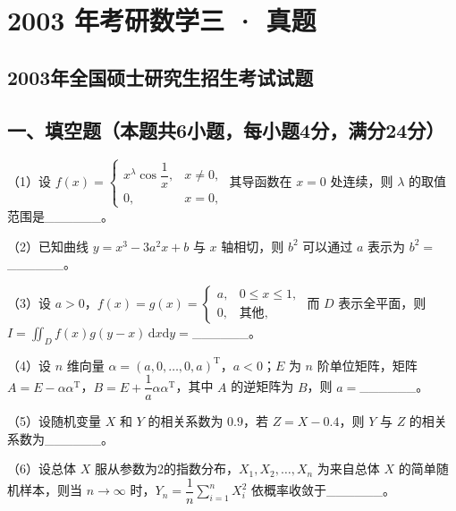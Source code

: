 \documentclass[UTF8,12pt]{ctexart}
\begin{document}
\section*{2003 年考研数学三 · 真题}
\subsection*{2003年全国硕士研究生招生考试试题}

\subsection*{一、填空题（本题共6小题，每小题4分，满分24分）}

（1）设 \(\displaystyle f(x)=\begin{cases}x^\lambda\cos\dfrac{\displaystyle 1}{\displaystyle x},\allowbreak &x\ne0,\allowbreak \\0,\allowbreak &x=0,\allowbreak \end{cases}\) 其导函数在 \(\displaystyle x=0\) 处连续，则 \(\displaystyle \lambda\) 的取值范围是\_\_\_\_\_\_。


（2）已知曲线 \(\displaystyle y=x^3-3a^2x+b\) 与 \(\displaystyle x\) 轴相切，则 \(\displaystyle b^2\) 可以通过 \(\displaystyle a\) 表示为 \(\displaystyle b^2=\)\_\_\_\_\_\_。


（3）设 \(\displaystyle a>0\)，\(\displaystyle f(x)=g(x)=\begin{cases}a,\allowbreak &0\le x\le1,\allowbreak \\0,\allowbreak &\text{其他},\allowbreak \end{cases}\) 而 \(\displaystyle D\) 表示全平面，则 \(\displaystyle I=\displaystyle \iint_Df(x)g(y-x)\,\mathrm dx\mathrm dy=\)\_\_\_\_\_\_。


（4）设 \(\displaystyle n\) 维向量 \(\displaystyle \alpha=(a,\allowbreak 0,\allowbreak \ldots,\allowbreak 0,\allowbreak a)^{\mathrm T}\)，\(\displaystyle a<0\)；\(\displaystyle E\) 为 \(\displaystyle n\) 阶单位矩阵，矩阵 \(\displaystyle A=E-\alpha\alpha^{\mathrm T}\)，\(\displaystyle B=E+\dfrac{\displaystyle 1}{\displaystyle a}\alpha\alpha^{\mathrm T}\)，其中 \(\displaystyle A\) 的逆矩阵为 \(\displaystyle B\)，则 \(\displaystyle a=\)\_\_\_\_\_\_。


（5）设随机变量 \(\displaystyle X\) 和 \(\displaystyle Y\) 的相关系数为 \(\displaystyle 0.9\)，若 \(\displaystyle Z=X-0.4\)，则 \(\displaystyle Y\) 与 \(\displaystyle Z\) 的相关系数为\_\_\_\_\_\_。


（6）设总体 \(\displaystyle X\) 服从参数为2的指数分布，\(\displaystyle X_1,\allowbreak X_2,\allowbreak \ldots,\allowbreak X_n\) 为来自总体 \(\displaystyle X\) 的简单随机样本，则当 \(\displaystyle n\to\infty\) 时，\(\displaystyle Y_n=\dfrac{\displaystyle 1}{\displaystyle n}\displaystyle \sum_{i=1}^nX_i^2\) 依概率收敛于\_\_\_\_\_\_。
\end{document}
